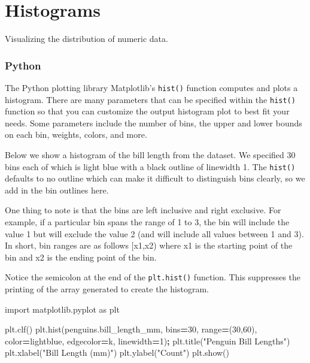 \documentclass[
]{book}
\newenvironment{Shaded}{\begin{snugshade}}{\end{snugshade}}
\newcommand{\BuiltInTok}[1]{#1}
\newcommand{\DecValTok}[1]{\textcolor[rgb]{0.00,0.00,0.81}{#1}}
\newcommand{\ImportTok}[1]{#1}
\newcommand{\NormalTok}[1]{#1}
\newcommand{\OperatorTok}[1]{\textcolor[rgb]{0.81,0.36,0.00}{\textbf{#1}}}
\newcommand{\StringTok}[1]{\textcolor[rgb]{0.31,0.60,0.02}{#1}}
\begin{document}
\hypertarget{histograms}{%
\section{Histograms}\label{histograms}}

Visualizing the distribution of numeric data.

\hypertarget{python-41}{%
\subsubsection*{Python}\label{python-41}}

The Python plotting library Matplotlib's \texttt{hist()} function computes and plots a histogram. There are many parameters that can be specified within the \texttt{hist()} function so that you can customize the output histogram plot to best fit your needs. Some parameters include the number of bins, the upper and lower bounds on each bin, weights, colors, and more.

Below we show a histogram of the bill length from the dataset. We specified 30 bins each of which is light blue with a black outline of linewidth 1. The \texttt{hist()} defaults to no outline which can make it difficult to distinguish bins clearly, so we add in the bin outlines here.

One thing to note is that the bins are left inclusive and right exclusive. For example, if a particular bin spans the range of 1 to 3, the bin will include the value 1 but will exclude the value 2 (and will include all values between 1 and 3). In short, bin ranges are as follows {[}x1,x2) where x1 is the starting point of the bin and x2 is the ending point of the bin.

Notice the semicolon at the end of the \texttt{plt.hist()} function. This suppresses the printing of the array generated to create the histogram.

\begin{Shaded}
\begin{Highlighting}[]
\ImportTok{import}\NormalTok{ matplotlib.pyplot }\ImportTok{as}\NormalTok{ plt}

\NormalTok{plt.clf()}
\NormalTok{plt.hist(penguins.bill\_length\_mm, bins}\OperatorTok{=}\DecValTok{30}\NormalTok{, }\BuiltInTok{range}\OperatorTok{=}\NormalTok{(}\DecValTok{30}\NormalTok{,}\DecValTok{60}\NormalTok{),}
\NormalTok{         color}\OperatorTok{=}\StringTok{\textquotesingle{}lightblue\textquotesingle{}}\NormalTok{, edgecolor}\OperatorTok{=}\StringTok{\textquotesingle{}k\textquotesingle{}}\NormalTok{, linewidth}\OperatorTok{=}\DecValTok{1}\NormalTok{)}\OperatorTok{;}
\NormalTok{plt.title(}\StringTok{"Penguin Bill Lengths"}\NormalTok{)}
\NormalTok{plt.xlabel(}\StringTok{"Bill Length (mm)"}\NormalTok{)}
\NormalTok{plt.ylabel(}\StringTok{"Count"}\NormalTok{)}
\NormalTok{plt.show()}
\end{Highlighting}
\end{Shaded}
\end{document}

